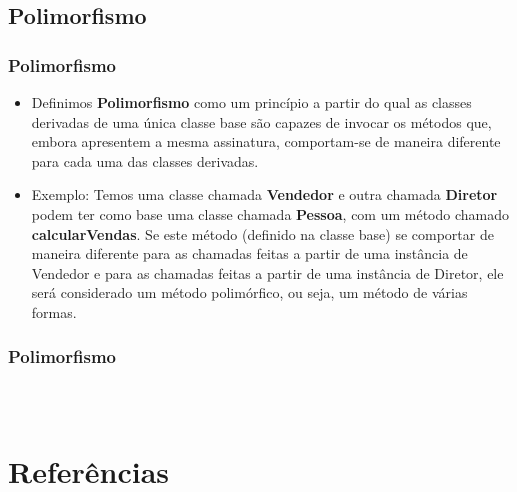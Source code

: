 \documentclass{beamer}
\begin{document}
\subsection{Polimorfismo}
\begin{frame}
	\frametitle{Polimorfismo}
	\begin{itemize}
		\item Definimos \textbf{Polimorfismo} como um princípio a partir do qual as classes derivadas de uma única classe base são capazes de invocar os métodos que, embora apresentem a mesma assinatura, comportam-se de maneira diferente para cada uma das classes derivadas.
		\item Exemplo: Temos uma classe chamada \textbf{Vendedor} e outra chamada \textbf{Diretor} podem ter como base uma classe chamada \textbf{Pessoa}, com um método chamado \textbf{calcularVendas}. Se este método (definido na classe base) se comportar de maneira diferente para as chamadas feitas a partir de uma instância de Vendedor e para as chamadas feitas a partir de uma instância de Diretor, ele será considerado um método polimórfico, ou seja, um método de várias formas.
	\end{itemize}
\end{frame}
\begin{frame}
	\frametitle{Polimorfismo}
	\inputminted{java}{codigos/Pessoa.java}
	\inputminted{java}{codigos/Vendedor.java}
	\inputminted{java}{codigos/Diretor.java}
\end{frame}
\section{Referências}
\end{document}
